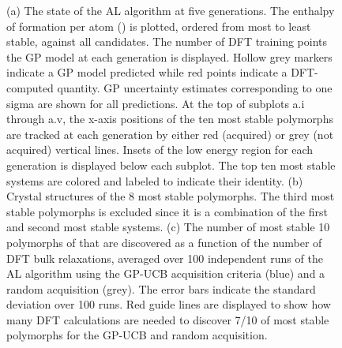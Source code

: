 \begin{figure}[!htb]
    \centering
    \caption{\label{fig:iro3_al}
        (a) The state of the AL algorithm at five generations.
        The enthalpy of formation per atom (\DHf) is plotted, ordered from most to least stable, against all \IrOthree candidates.
        The number of DFT training points the GP model at each generation is displayed.
        Hollow grey markers indicate a GP model predicted \DHf while red points indicate a DFT-computed quantity.
        GP uncertainty estimates corresponding to one sigma are shown for all predictions.
        At the top of subplots a.i through a.v, the x-axis positions of the ten most stable polymorphs are tracked at each generation by either red (acquired) or grey (not acquired) vertical lines.
        Insets of the low energy region for each generation is displayed below each subplot.
        The top ten most stable systems are colored and labeled to indicate their identity.
        (b) Crystal structures of the \num{8} most stable \IrOthree polymorphs.
        The third most stable polymorphs is excluded since it is a combination of the first and second most stable systems.
        (c) The number of most stable \num{10} polymorphs of \IrOthree that are discovered as a function of the number of DFT bulk relaxations,
        averaged over \num{100} independent runs of the AL algorithm using the GP-UCB acquisition criteria (blue) and a random acquisition (grey).
        The error bars indicate the standard deviation over \num{100} runs.
        Red guide lines are displayed to show how many DFT calculations are needed to discover \num{7/10} of most stable polymorphs for the GP-UCB and random acquisition.
    }
\end{figure}

